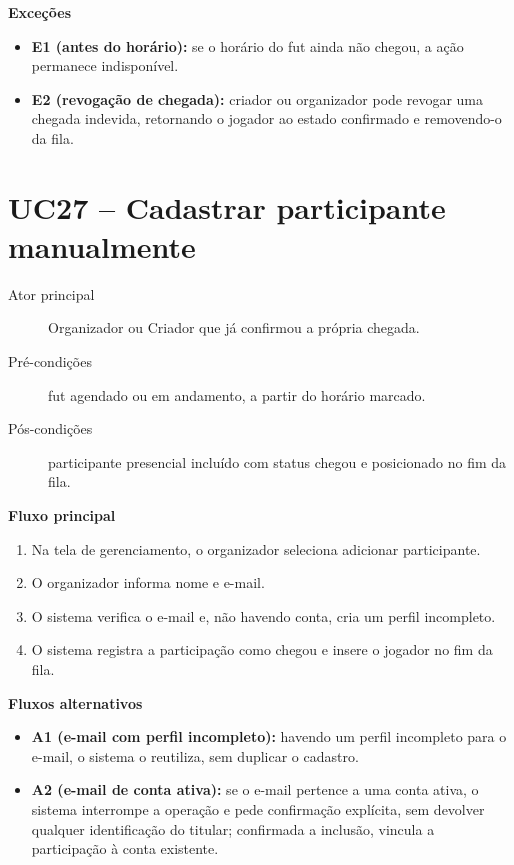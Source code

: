 \begin{apendicesenv}
        \noindent\textbf{Exceções}
        \begin{itemize}
            \item \textbf{E1 (antes do horário):} se o horário do fut ainda não chegou, a ação permanece indisponível.
            \item \textbf{E2 (revogação de chegada):} criador ou organizador pode revogar uma chegada indevida, retornando o jogador ao estado confirmado e removendo-o da fila.
        \end{itemize}

    \section*{UC27 -- Cadastrar participante manualmente}
        \begin{description}
            \item[Ator principal] Organizador ou Criador que já confirmou a própria chegada.
            \item[Pré-condições] fut agendado ou em andamento, a partir do horário marcado.
            \item[Pós-condições] participante presencial incluído com status chegou e posicionado no fim da fila.
        \end{description}

        \noindent\textbf{Fluxo principal}
        \begin{enumerate}
            \item Na tela de gerenciamento, o organizador seleciona adicionar participante.
            \item O organizador informa nome e e-mail.
            \item O sistema verifica o e-mail e, não havendo conta, cria um perfil incompleto.
            \item O sistema registra a participação como chegou e insere o jogador no fim da fila.
        \end{enumerate}

        \noindent\textbf{Fluxos alternativos}
        \begin{itemize}
            \item \textbf{A1 (e-mail com perfil incompleto):} havendo um perfil incompleto para o e-mail, o sistema o reutiliza, sem duplicar o cadastro.
            \item \textbf{A2 (e-mail de conta ativa):} se o e-mail pertence a uma conta ativa, o sistema interrompe a operação e pede confirmação explícita, sem devolver qualquer identificação do titular; confirmada a inclusão, vincula a participação à conta existente.
        \end{itemize}


\end{apendicesenv}
